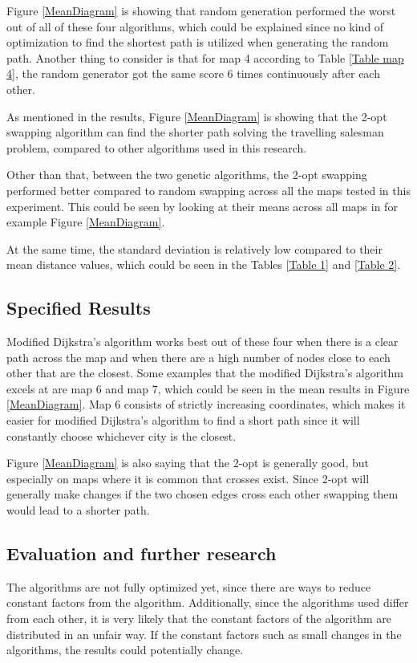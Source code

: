 \documentclass{article}
\begin{document}
\noindent
Figure \ref{MeanDiagram} is showing that random generation performed the worst out of all of these four algorithms, which could be explained since no kind of optimization to find the shortest path is utilized when generating the random path. Another thing to consider is that for map 4 according to Table \ref{Table map 4}, the random generator got the same score 6 times continuously after each other.

\noindent
As mentioned in the results, Figure \ref{MeanDiagram} is showing that the 2-opt swapping algorithm can find the shorter path solving the travelling salesman problem, compared to other algorithms used in this research.

\noindent
Other than that, between the two genetic algorithms, the 2-opt swapping performed better compared to random swapping across all the maps tested in this experiment. This could be seen by looking at their means across all maps in for example Figure \ref{MeanDiagram}. 

\noindent
At the same time, the standard deviation is relatively low compared to their mean distance values, which could be seen in the Tables \ref{Table 1} and \ref{Table 2}. 

\subsection{Specified Results}\label{subsec2}
Modified Dijkstra's algorithm works best out of these four when there is a clear path across the map and when there are a high number of nodes close to each other that are the closest. Some examples that the modified Dijkstra's algorithm excels at are map 6 and map 7, which could be seen in the mean results in Figure \ref{MeanDiagram}. Map 6 consists of strictly increasing coordinates, which makes it easier for modified Dijkstra's algorithm to find a short path since it will constantly choose whichever city is the closest. 

\noindent
Figure \ref{MeanDiagram} is also saying that the 2-opt is generally good, but especially on maps where it is common that crosses exist. Since 2-opt will generally make changes if the two chosen edges cross each other swapping them would lead to a shorter path.


\subsection{Evaluation and further research}\label{subsec3}
The algorithms are not fully optimized yet, since there are ways to reduce constant factors from the algorithm. Additionally, since the algorithms used differ from each other, it is very likely that the constant factors of the algorithm are distributed in an unfair way. If the constant factors such as small changes in the algorithms, the results could potentially change. 
\end{document}
